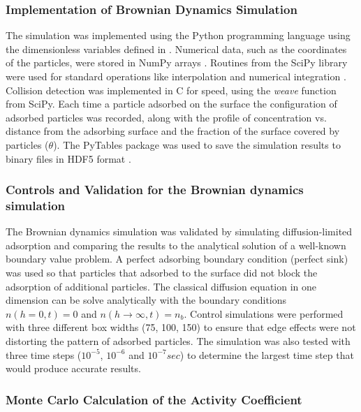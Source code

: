 \subsubsection{Implementation of Brownian Dynamics Simulation}

The simulation was implemented using the Python programming language
using the dimensionless variables defined in \cite{Magan2004}. Numerical
data, such as the coordinates of the particles, were stored in NumPy
arrays \cite{Oliphant2006}. Routines from the SciPy library were
used for standard operations like interpolation and numerical integration
\cite{Oliphant2007}. Collision detection was implemented in C for
speed, using the \emph{weave} function from SciPy. Each time a particle
adsorbed on the surface the configuration of adsorbed particles was
recorded, along with the profile of concentration vs. distance from
the adsorbing surface and the fraction of the surface covered by particles
($\theta$). The PyTables package was used to save the simulation
results to binary files in HDF5 format \cite{Alted2002-,HDFGroup2000-}. 


\subsubsection{Controls and Validation for the Brownian dynamics simulation}

The Brownian dynamics simulation was validated by simulating diffusion-limited
adsorption and comparing the results to the analytical solution of
a well-known boundary value problem. A perfect adsorbing boundary
condition (perfect sink) was used so that particles that adsorbed
to the surface did not block the adsorption of additional particles.
The classical diffusion equation in one dimension can be solve analytically
with the boundary conditions $n(h=0,t)=0$ and $n(h\rightarrow\infty,t)=n_{b}$.
Control simulations were performed with three different box widths
(75, 100, 150) to ensure that edge effects were not distorting the
pattern of adsorbed particles. The simulation was also tested with
three time steps ($10^{-5}$, $10^{-6}$ and $10^{-7}sec$) to determine
the largest time step that would produce accurate results.


\subsubsection{Monte Carlo Calculation of the Activity Coefficient}

